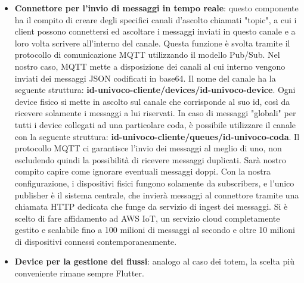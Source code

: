 \documentclass[a4paper, titlepage, 12pt, openright, twoside]{book}
\begin{document}
\begin{itemize}
	\item \textbf{Connettore per l'invio di messaggi in tempo reale}: questo componente ha il compito di creare degli specifici canali d'ascolto chiamati "topic",
				 a cui i client possono connettersi ed ascoltare i messaggi inviati in questo canale e a loro volta scrivere all'interno del canale. Questa funzione è svolta
				 tramite il protocollo di comunicazione MQTT utilizzando il modello Pub/Sub. Nel nostro caso, MQTT mette a disposizione dei canali al cui interno vengono inviati
				 dei messaggi JSON codificati in base64. Il nome del canale ha la seguente struttura: \textbf{id-univoco-cliente/devices/id-univoco-device}.
				 Ogni device fisico si mette in ascolto sul canale che corrisponde al suo id, così da ricevere solamente i messaggi a lui riservati. In caso di messaggi "globali"
				 per tutti i device collegati ad una particolare coda, è possibile utilizzare il canale con la seguente struttura: \textbf{id-univoco-cliente/queues/id-univoco-coda}.
				 Il protocollo MQTT ci garantisce l'invio dei messaggi al meglio di uno, non escludendo quindi la possibilità di ricevere messaggi duplicati. Sarà nostro compito
				 capire come ignorare eventuali messaggi doppi. Con la nostra configurazione, i dispositivi fisici fungono solamente da subscribers, e l'unico publisher è 
				 il sistema centrale, che invierà messaggi al connettore tramite una chiamata HTTP dedicata che funge da servizio di ingest dei messaggi. 
				 Si è scelto di fare affidamento ad AWS IoT, un servizio cloud completamente gestito e scalabile fino a 100 milioni
				 di messaggi al secondo e oltre 10 milioni di dispositivi connessi contemporaneamente.
				 
	\item \textbf{Device per la gestione dei flussi}: analogo al caso dei totem, la scelta più conveniente rimane sempre Flutter.
	
\end{itemize}
\end{document}

